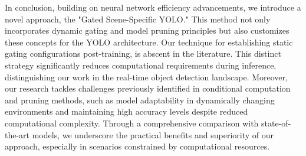 In conclusion, building on neural network efficiency advancements, we introduce a novel approach, the "Gated Scene-Specific YOLO." This method not only incorporates dynamic gating and model pruning principles but also customizes these concepts for the YOLO architecture. Our technique for establishing static gating configurations post-training, is abscent in the literature. This distinct strategy significantly reduces computational requirements during inference, distinguishing our work in the real-time object detection landscape. Moreover, our research tackles challenges previously identified in conditional computation and pruning methods, such as model adaptability in dynamically changing environments and maintaining high accuracy levels despite reduced computational complexity. Through a comprehensive comparison with state-of-the-art models, we underscore the practical benefits and superiority of our approach, especially in scenarios constrained by computational resources.


\clearpage
